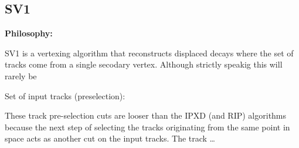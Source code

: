 \subsection{SV1}
\label{subsec:sv1}

\def\figpath{figures/ftag/ANA-FTAG-2019-07-PAPER/sv1}

\textbf{Philosophy:} 

SV1 is a vertexing algorithm that reconstructs displaced decays where the set of tracks come from a single secodary vertex.
Although strictly speakig this will rarely be 

Set of input tracks (preselection):

These track pre-selection cuts are looser than the IPXD (and RIP) algorithms because the next step of selecting the tracks originating from the same point in space acts as another cut on the input tracks. The track \ldots



